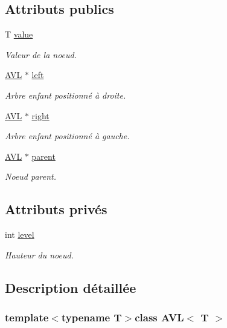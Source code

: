 \subsection*{Attributs publics}
\begin{DoxyCompactItemize}
\item 
T \hyperlink{class_a_v_l_a3f5c40790a92e0ebd93a187812d6b698}{value}
\begin{DoxyCompactList}\small\item\em Valeur de la noeud. \end{DoxyCompactList}\item 
\hyperlink{class_a_v_l}{A\-V\-L} $\ast$ \hyperlink{class_a_v_l_aa1ea6df15798ce98461729e2b1deeb87}{left}
\begin{DoxyCompactList}\small\item\em Arbre enfant positionné à droite. \end{DoxyCompactList}\item 
\hyperlink{class_a_v_l}{A\-V\-L} $\ast$ \hyperlink{class_a_v_l_ac02dee89f769588763a80be6176af37b}{right}
\begin{DoxyCompactList}\small\item\em Arbre enfant positionné à gauche. \end{DoxyCompactList}\item 
\hyperlink{class_a_v_l}{A\-V\-L} $\ast$ \hyperlink{class_a_v_l_a3978c23794aa5e11eb37473e1cebe4e5}{parent}
\begin{DoxyCompactList}\small\item\em Noeud parent. \end{DoxyCompactList}\end{DoxyCompactItemize}
\subsection*{Attributs privés}
\begin{DoxyCompactItemize}
\item 
int \hyperlink{class_a_v_l_aa5309553367542c5683df0fae61bfc0a}{level}
\begin{DoxyCompactList}\small\item\em Hauteur du noeud. \end{DoxyCompactList}\end{DoxyCompactItemize}


\subsection{Description détaillée}
\subsubsection*{template$<$typename T$>$class A\-V\-L$<$ T $>$}

